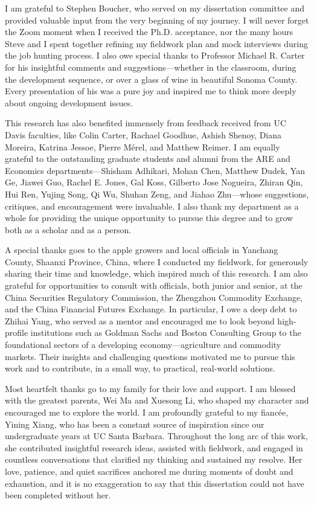 \documentclass[12pt,authoryear, notitlepage]{elegantpaper}
\begin{document}
\begin{acknowledgments}
I am grateful to Stephen Boucher, who served on my dissertation committee and provided valuable input from the very beginning of my journey. I will never forget the Zoom moment when I received the Ph.D. acceptance, nor the many hours Steve and I spent together refining my fieldwork plan and mock interviews during the job hunting process. I also owe special thanks to Professor Michael R. Carter for his insightful comments and suggestions---whether in the classroom, during the development sequence, or over a glass of wine in beautiful Sonoma County. Every presentation of his was a pure joy and inspired me to think more deeply about ongoing development issues.

This research has also benefited immensely from feedback received from UC Davis faculties, like Colin Carter, Rachael Goodhue, Ashish Shenoy, Diana Moreira, Katrina Jessoe, Pierre M\'erel, and Matthew Reimer. I am equally grateful to the outstanding graduate students and alumni from the ARE and Economics departments---Shisham Adhikari, Mohan Chen, Matthew Dudek, Yan Ge, Jiawei Guo, Rachel E. Jones, Gal Koss, Gilberto Jose Nogueira, Zhiran Qin, Hui Ren, Yujing Song, Qi Wu, Shuhan Zeng, and Jiahao Zhu---whose suggestions, critiques, and encouragement were invaluable. I also thank my department as a whole for providing the unique opportunity to pursue this degree and to grow both as a scholar and as a person.

A special thanks goes to the apple growers and local officials in Yanchang County, Shaanxi Province, China, where I conducted my fieldwork, for generously sharing their time and knowledge, which inspired much of this research. I am also grateful for opportunities to consult with officials, both junior and senior, at the China Securities Regulatory Commission, the Zhengzhou Commodity Exchange, and the China Financial Futures Exchange. In particular, I owe a deep debt to Zhihai Yang, who served as a mentor and encouraged me to look beyond high-profile institutions such as Goldman Sachs and Boston Consulting Group to the foundational sectors of a developing economy---agriculture and commodity markets. Their insights and challenging questions motivated me to pursue this work and to contribute, in a small way, to practical, real-world solutions.

Most heartfelt thanks go to my family for their love and support. I am blessed with the greatest parents, Wei Ma and Xuesong Li, who shaped my character and encouraged me to explore the world. I am profoundly grateful to my fianc\'ee, Yining Xiang, who has been a constant source of inspiration since our undergraduate years at UC Santa Barbara. Throughout the long arc of this work, she contributed insightful research ideas, assisted with fieldwork, and engaged in countless conversations that clarified my thinking and sustained my resolve. Her love, patience, and quiet sacrifices anchored me during moments of doubt and exhaustion, and it is no exaggeration to say that this dissertation could not have been completed without her.


\end{acknowledgments}
\end{document}
